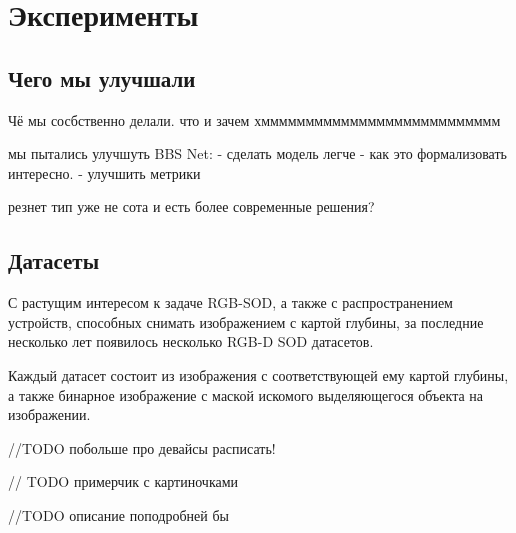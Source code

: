 \section{Эксперименты}

\subsection{Чего мы улучшали}


Чё мы сосбственно делали. что и зачем хммммммммммммммммммммммммммм
 
мы пытались улучшуть BBS Net:
-  сделать модель легче - как это формализовать интересно. 
- улучшить метрики 

резнет тип уже не сота и есть более современные решения?



\subsection{Датасеты}

С растущим интересом к задаче RGB-SOD, а также с распространением устройств, способных 
снимать изображением с картой глубины, за последние несколько лет появилось несколько RGB-D SOD датасетов.

Каждый датасет состоит из изображения с соответствующей ему картой глубины, а также
бинарное изображение с маской искомого выделяющегося объекта на изображении.

//TODO побольше про девайсы расписать!

// TODO примерчик с картиночками

//TODO описание поподробней бы

